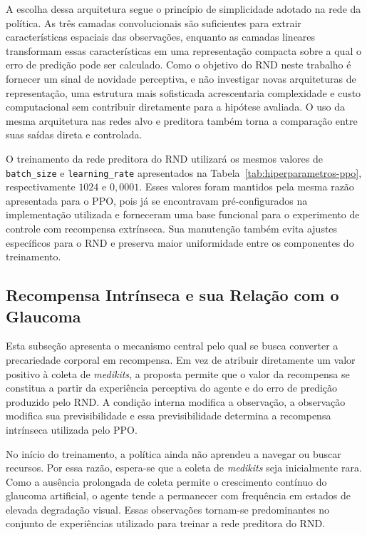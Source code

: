A escolha dessa arquitetura segue o princípio de simplicidade adotado na rede da política. As três camadas convolucionais são suficientes para extrair características espaciais das observações, enquanto as camadas lineares transformam essas características em uma representação compacta sobre a qual o erro de predição pode ser calculado. Como o objetivo do RND neste trabalho é fornecer um sinal de novidade perceptiva, e não investigar novas arquiteturas de representação, uma estrutura mais sofisticada acrescentaria complexidade e custo computacional sem contribuir diretamente para a hipótese avaliada. O uso da mesma arquitetura nas redes alvo e preditora também torna a comparação entre suas saídas direta e controlada.

O treinamento da rede preditora do RND utilizará os mesmos valores de \texttt{batch\_size} e \texttt{learning\_rate} apresentados na Tabela~\ref{tab:hiperparametros-ppo}, respectivamente $1024$ e $0{,}0001$. Esses valores foram mantidos pela mesma razão apresentada para o PPO, pois já se encontravam pré-configurados na implementação utilizada e forneceram uma base funcional para o experimento de controle com recompensa extrínseca. Sua manutenção também evita ajustes específicos para o RND e preserva maior uniformidade entre os componentes do treinamento.

\subsection{Recompensa Intrínseca e sua Relação com o Glaucoma}

Esta subseção apresenta o mecanismo central pelo qual se busca converter a precariedade corporal em recompensa. Em vez de atribuir diretamente um valor positivo à coleta de \textit{medikits}, a proposta permite que o valor da recompensa se constitua a partir da experiência perceptiva do agente e do erro de predição produzido pelo RND. A condição interna modifica a observação, a observação modifica sua previsibilidade e essa previsibilidade determina a recompensa intrínseca utilizada pelo PPO.

No início do treinamento, a política ainda não aprendeu a navegar ou buscar recursos. Por essa razão, espera-se que a coleta de \textit{medikits} seja inicialmente rara. Como a ausência prolongada de coleta permite o crescimento contínuo do glaucoma artificial, o agente tende a permanecer com frequência em estados de elevada degradação visual. Essas observações tornam-se predominantes no conjunto de experiências utilizado para treinar a rede preditora do RND.


